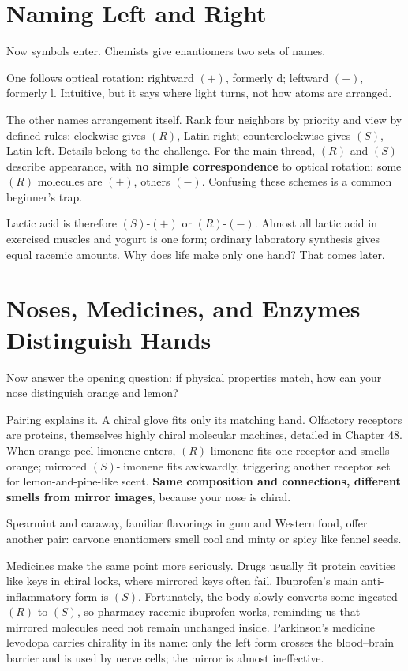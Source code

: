 \section{Naming Left and Right}

Now symbols enter. Chemists give enantiomers two sets of names.

One follows optical rotation: rightward $(+)$, formerly d; leftward $(-)$, formerly l. Intuitive, but it says where light turns, not how atoms are arranged.

The other names arrangement itself. Rank four neighbors by priority and view by defined rules: clockwise gives $(R)$, Latin right; counterclockwise gives $(S)$, Latin left. Details belong to the challenge. For the main thread, $(R)$ and $(S)$ describe appearance, with \textbf{no simple correspondence} to optical rotation: some $(R)$ molecules are $(+)$, others $(-)$. Confusing these schemes is a common beginner's trap.

Lactic acid is therefore $(S)$-$(+)$ or $(R)$-$(-)$. Almost all lactic acid in exercised muscles and yogurt is one form; ordinary laboratory synthesis gives equal racemic amounts. Why does life make only one hand? That comes later.

\section{Noses, Medicines, and Enzymes Distinguish Hands}

Now answer the opening question: if physical properties match, how can your nose distinguish orange and lemon?

Pairing explains it. A chiral glove fits only its matching hand. Olfactory receptors are proteins, themselves highly chiral molecular machines, detailed in Chapter 48. When orange-peel limonene enters, $(R)$-limonene fits one receptor and smells orange; mirrored $(S)$-limonene fits awkwardly, triggering another receptor set for lemon-and-pine-like scent. \textbf{Same composition and connections, different smells from mirror images}, because your nose is chiral.

Spearmint and caraway, familiar flavorings in gum and Western food, offer another pair: carvone enantiomers smell cool and minty or spicy like fennel seeds.

Medicines make the same point more seriously. Drugs usually fit protein cavities like keys in chiral locks, where mirrored keys often fail. Ibuprofen's main anti-inflammatory form is $(S)$. Fortunately, the body slowly converts some ingested $(R)$ to $(S)$, so pharmacy racemic ibuprofen works, reminding us that mirrored molecules need not remain unchanged inside. Parkinson's medicine levodopa carries chirality in its name: only the left form crosses the blood--brain barrier and is used by nerve cells; the mirror is almost ineffective.

